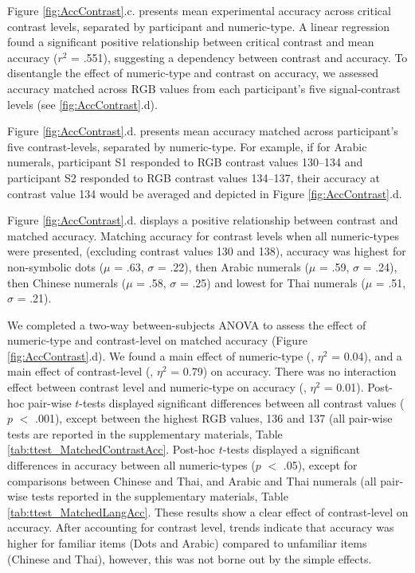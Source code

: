 Figure \ref{fig:AccContrast}.c. presents mean experimental accuracy across critical contrast levels, separated by participant and numeric-type. A linear regression found a significant positive relationship between critical contrast and mean accuracy ($r^2$ = .551), suggesting a dependency between contrast and accuracy. To disentangle the effect of numeric-type and contrast on accuracy, we assessed accuracy matched across RGB values from each participant's five signal-contrast levels (see \ref{fig:AccContrast}.d).

Figure \ref{fig:AccContrast}.d. presents mean accuracy matched across participant's five contrast-levels, separated by numeric-type. For example, if for Arabic numerals, participant S1 responded to RGB contrast values 130--134 and participant S2 responded to RGB contrast values 134--137, their accuracy at contrast value 134 would be averaged and depicted in Figure \ref{fig:AccContrast}.d. 

Figure \ref{fig:AccContrast}.d. displays a positive relationship between contrast and matched accuracy. Matching accuracy for contrast levels when all numeric-types were presented, (\ie excluding contrast values 130 and 138), accuracy was highest for non-symbolic dots ($\mu$ = .63, $\sigma$ = .22), then Arabic numerals ($\mu$ = .59, $\sigma$ = .24), then Chinese numerals ($\mu$ = .58, $\sigma$ = .25) and lowest for Thai numerals ($\mu$ = .51, $\sigma$ = .21). 

We completed a two-way between-subjects ANOVA to assess the effect of numeric-type and contrast-level on matched accuracy (Figure \ref{fig:AccContrast}.d). We found a main effect of numeric-type (, $\eta^2$ = 0.04), and a main effect of contrast-level (, $\eta^2$ = 0.79) on accuracy. There was no interaction effect between contrast level and numeric-type on accuracy (, $\eta^2$ = 0.01). Post-hoc pair-wise $t$-tests displayed significant differences between all contrast values ($p$ $<$ .001), except between the highest RGB values, 136 and 137 (all pair-wise tests are reported in the supplementary materials, Table \ref{tab:ttest_MatchedContrastAcc}. Post-hoc $t$-tests displayed a significant differences in accuracy between all numeric-types ($p$ $<$ .05), except for comparisons between Chinese and Thai, and Arabic and Thai numerals (all pair-wise tests reported in the supplementary materials, Table \ref{tab:ttest_MatchedLangAcc}. These results show a clear effect of contrast-level on accuracy. After accounting for contrast level, trends indicate that accuracy was higher for familiar items (Dots and Arabic) compared to unfamiliar items (Chinese and Thai), however, this was not borne out by the simple effects.


